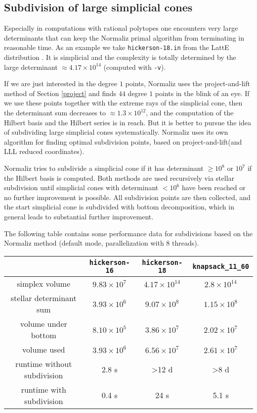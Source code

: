 \documentclass[12pt,a4paper]{scrartcl}
\theoremstyle{definition}
\def\ttt{\texttt}
\begin{document}
{	\subsection{Subdivision of large simplicial cones}\label{subdiv}
	
	Especially in computations with rational polytopes one encounters very large determinants that can keep the Normaliz primal algorithm from terminating in reasonable time. As an example we take \verb|hickerson-18.in| from the LattE distribution \cite{LatInt}. It is simplicial and the complexity is totally determined by the large determinant $\approx 4.17\times 10^{14}$ (computed with \verb|-v|). 
	
	If we are just interested in the degree $1$ points, Normaliz uses the project-and-lift method of Section \ref{project} and finds $44$ degree $1$ points in the blink of an eye. If we use these points together with the extreme rays of the simplicial cone, then the determinant sum decreases to $\approx 1.3\times 10^{12}$, and the computation of the Hilbert basis and the Hilbert series is in reach. But it is better to pursue the idea of subdividing large simplicial cones systematically. Normaliz 
	uses its own algorithm for finding optimal subdivision points, based on project-and-lift(and LLL reduced coordinates).
	
	Normaliz tries to subdivide a simplicial cone if it has determinant $\ge 10^8$ or $10^7$ if the Hilbert basis is computed. Both methods are used recursively via stellar subdivision until simplicial cones with determinant $< 10^6$ have been reached or no further improvement is possible. All subdivision points are then collected, and the start simplicial cone is subdivided with bottom decomposition, which in general leads to substantial further improvement.
	
	The following table contains some performance data for subdivisions based on the Normaliz method (default mode, parallelization with 8 threads).
	\begin{center}
		\setlength{\tabcolsep}{3.2pt}
		\renewcommand{\arraystretch}{1.2}
		\begin{tabular}{|c|c|c|c|}
			\hline
			& \ttt{hickerson-16} & \ttt{hickerson-18} & \ttt{knapsack\_11\_60}  \\ \hline
			simplex volume & $9.83\times 10^7$ & $4.17\times 10^{14}$ & $2.8\times 10^{14}$ \\ \hline
			stellar determinant sum & $3.93\times 10^6$  & $9.07\times 10^8$  & $1.15\times 10^8$\\ \hline
			volume under bottom  & $8.10\times 10^5$ & $3.86\times 10^7$ & $2.02\times 10^7$ \\ \hline 
			volume used     & $3.93\times 10^6$ & $6.56\times 10^7$ & $2.61\times 10^7$ \\ \hline
			runtime without subdivision   &  2.8 s & >12 d &  >8 d \\ \hline
			runtime with subdivision    &  0.4 s & 24 s & 5.1 s \\ \hline
		\end{tabular}
	\end{center}
	
}
\end{document}
